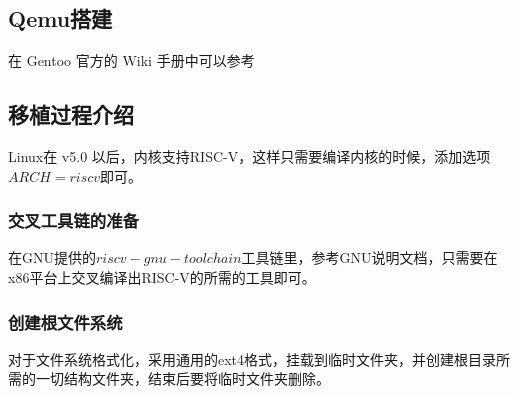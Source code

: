 \subsection{Qemu搭建}
在 Gentoo 官方的 Wiki 手册中可以参考 \cite{GentooQemu}

\subsection{移植过程介绍}
Linux在 v5.0 以后，内核支持RISC-V，这样只需要编译内核的时候，添加选项$ARCH=riscv$即可。

\subsubsection{交叉工具链的准备}
在GNU提供的$riscv-gnu-toolchain$工具链里，参考GNU说明文档，只需要在x86平台上交叉编译出RISC-V的所需的工具即可。

\subsubsection{创建根文件系统}
对于文件系统格式化，采用通用的ext4格式，挂载到临时文件夹，并创建根目录所需的一切结构文件夹，结束后要将临时文件夹删除。

